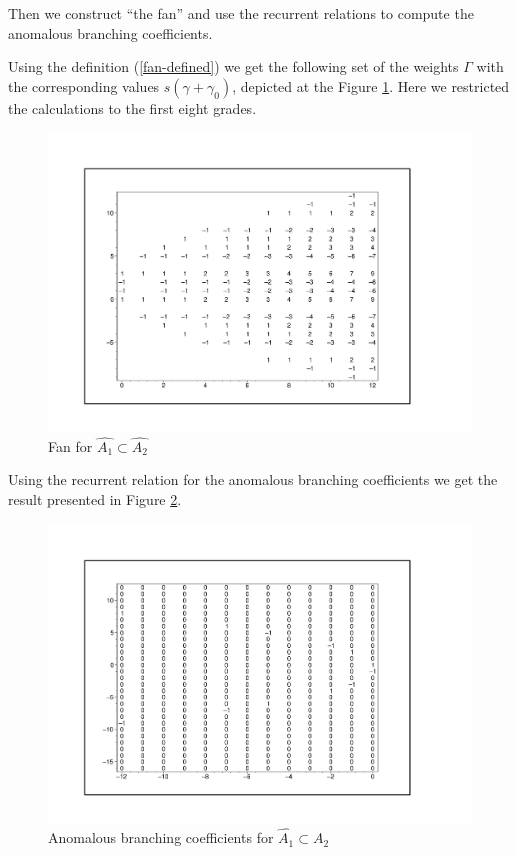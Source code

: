 \documentclass[a4paper,12pt]{article}
\theoremstyle{definition} \newtheorem{Def}{Definition}
\begin{document}
Then we construct ``the fan'' and use the recurrent relations to compute the anomalous branching coefficients.

Using the definition (\ref{fan-defined}) we get the following set of
the weights $\Gamma$ with the corresponding values $s(\gamma+\gamma_0)$, depicted at the Figure \ref{fig:AffineA2A1Fan}.
Here we restricted the calculations to the first eight grades.
\begin{figure}[p]
  \centering
  \includegraphics[width=130mm]{AffineA2_A1_fan.pdf}
  \caption{Fan for $\hat{A_1}\subset \hat{A_2}$}
  \label{fig:AffineA2A1Fan}
\end{figure}

Using the recurrent relation for the anomalous branching coefficients we get the result presented in Figure \ref{fig:AffineA2_A1_branching}. 
\begin{figure}[p]
  \centering
  \includegraphics[width=130mm]{AffineA2_A1_branching.pdf}
  \caption{Anomalous branching coefficients for $\hat{A_1}\subset \hat{A_2}$}
  \label{fig:AffineA2_A1_branching}
\end{figure}
\end{document}

